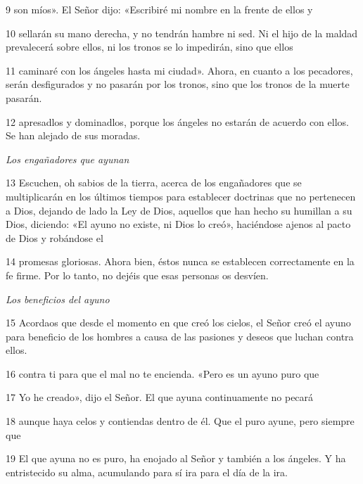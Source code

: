 \par 9 son míos». El Señor dijo: «Escribiré mi nombre en la frente de ellos y

\par 10 sellarán su mano derecha, y no tendrán hambre ni sed. Ni el hijo de la maldad prevalecerá sobre ellos, ni los tronos se lo impedirán, sino que ellos

\par 11 caminaré con los ángeles hasta mi ciudad». Ahora, en cuanto a los pecadores, serán desfigurados y no pasarán por los tronos, sino que los tronos de la muerte pasarán.

\par 12 apresadlos y dominadlos, porque los ángeles no estarán de acuerdo con ellos. Se han alejado de sus moradas.

\par \textit{Los engañadores que ayunan}

\par 13 Escuchen, oh sabios de la tierra, acerca de los engañadores que se multiplicarán en los últimos tiempos para establecer doctrinas que no pertenecen a Dios, dejando de lado la Ley de Dios, aquellos que han hecho su humillan a su Dios, diciendo: «El ayuno no existe, ni Dios lo creó», haciéndose ajenos al pacto de Dios y robándose el

\par 14 promesas gloriosas. Ahora bien, éstos nunca se establecen correctamente en la fe firme. Por lo tanto, no dejéis que esas personas os desvíen.

\par \textit{Los beneficios del ayuno}

\par 15 Acordaos que desde el momento en que creó los cielos, el Señor creó el ayuno para beneficio de los hombres a causa de las pasiones y deseos que luchan contra ellos.

\par 16 contra ti para que el mal no te encienda. «Pero es un ayuno puro que

\par 17 Yo he creado», dijo el Señor. El que ayuna continuamente no pecará

\par 18 aunque haya celos y contiendas dentro de él. Que el puro ayune, pero siempre que

\par 19 El que ayuna no es puro, ha enojado al Señor y también a los ángeles. Y ha entristecido su alma, acumulando para sí ira para el día de la ira.

